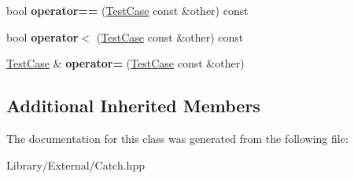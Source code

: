 \begin{DoxyCompactItemize}
\item 
\hypertarget{class_catch_1_1_test_case_a40eab521b316c7d476f6b4dd1c33eec8}{}bool {\bfseries operator==} (\hyperlink{class_catch_1_1_test_case}{Test\+Case} const \&other) const \label{class_catch_1_1_test_case_a40eab521b316c7d476f6b4dd1c33eec8}

\item 
\hypertarget{class_catch_1_1_test_case_aa5174e85e3aac6e7398dee9c76730324}{}bool {\bfseries operator$<$} (\hyperlink{class_catch_1_1_test_case}{Test\+Case} const \&other) const \label{class_catch_1_1_test_case_aa5174e85e3aac6e7398dee9c76730324}

\item 
\hypertarget{class_catch_1_1_test_case_a8022e3f74232f7887d2d2cbbc8876502}{}\hyperlink{class_catch_1_1_test_case}{Test\+Case} \& {\bfseries operator=} (\hyperlink{class_catch_1_1_test_case}{Test\+Case} const \&other)\label{class_catch_1_1_test_case_a8022e3f74232f7887d2d2cbbc8876502}

\end{DoxyCompactItemize}
\subsection*{Additional Inherited Members}


The documentation for this class was generated from the following file\+:\begin{DoxyCompactItemize}
\item 
Library/\+External/Catch.\+hpp\end{DoxyCompactItemize}
